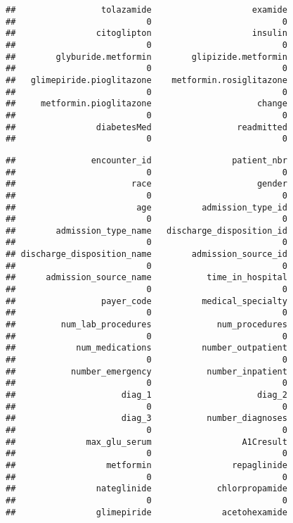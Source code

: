 \documentclass[
]{article}
\begin{document}
\begin{verbatim}
##                 tolazamide                    examide 
##                          0                          0 
##                citoglipton                    insulin 
##                          0                          0 
##        glyburide.metformin        glipizide.metformin 
##                          0                          0 
##   glimepiride.pioglitazone    metformin.rosiglitazone 
##                          0                          0 
##     metformin.pioglitazone                     change 
##                          0                          0 
##                diabetesMed                 readmitted 
##                          0                          0
\end{verbatim}

\begin{verbatim}
##               encounter_id                patient_nbr 
##                          0                          0 
##                       race                     gender 
##                          0                          0 
##                        age          admission_type_id 
##                          0                          0 
##        admission_type_name   discharge_disposition_id 
##                          0                          0 
## discharge_disposition_name        admission_source_id 
##                          0                          0 
##      admission_source_name           time_in_hospital 
##                          0                          0 
##                 payer_code          medical_specialty 
##                          0                          0 
##         num_lab_procedures             num_procedures 
##                          0                          0 
##            num_medications          number_outpatient 
##                          0                          0 
##           number_emergency           number_inpatient 
##                          0                          0 
##                     diag_1                     diag_2 
##                          0                          0 
##                     diag_3           number_diagnoses 
##                          0                          0 
##              max_glu_serum                  A1Cresult 
##                          0                          0 
##                  metformin                repaglinide 
##                          0                          0 
##                nateglinide             chlorpropamide 
##                          0                          0 
##                glimepiride              acetohexamide 

\end{verbatim}
\end{document}
